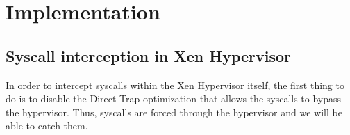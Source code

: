  \section{Implementation} \label{sec:impl}

\subsection{Syscall interception in Xen Hypervisor}\label{sec:interception}
In order to intercept syscalls within the Xen Hypervisor itself, the first thing to 
do is to disable the Direct Trap optimization that allows the syscalls to bypass the 
hypervisor. Thus, syscalls are forced through the hypervisor and we will be able to 
catch them.
